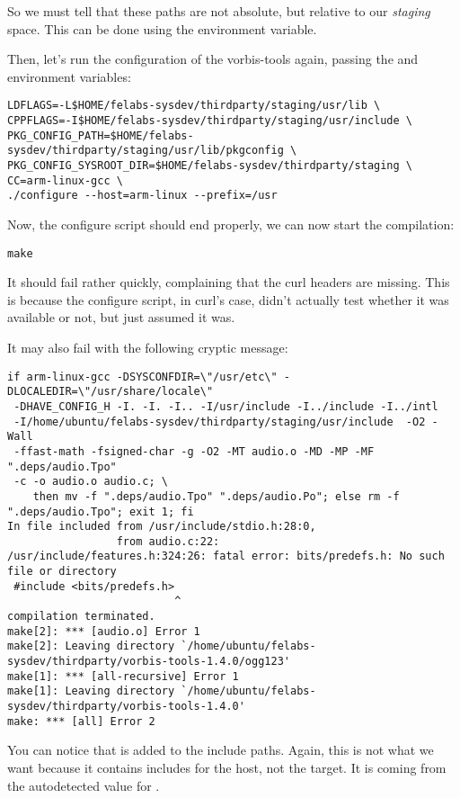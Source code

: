 So we must tell  that these paths are not absolute,
but relative to our {\em staging} space. This can be done using the
 environment variable.

Then, let's run the configuration of the vorbis-tools again, passing
the  and 
environment variables:

\small
\begin{verbatim}
LDFLAGS=-L$HOME/felabs-sysdev/thirdparty/staging/usr/lib \
CPPFLAGS=-I$HOME/felabs-sysdev/thirdparty/staging/usr/include \
PKG_CONFIG_PATH=$HOME/felabs-sysdev/thirdparty/staging/usr/lib/pkgconfig \
PKG_CONFIG_SYSROOT_DIR=$HOME/felabs-sysdev/thirdparty/staging \
CC=arm-linux-gcc \
./configure --host=arm-linux --prefix=/usr
\end{verbatim}
\normalsize

Now, the configure script should end properly, we can now start the
compilation:
\begin{verbatim}
make
\end{verbatim}

It should fail rather quickly, complaining that the curl headers are
missing. This is because the configure script, in curl's case, didn't
actually test whether it was available or not, but just assumed it was.

It may also fail with the following cryptic message:
\small
\begin{verbatim}
if arm-linux-gcc -DSYSCONFDIR=\"/usr/etc\" -DLOCALEDIR=\"/usr/share/locale\"
 -DHAVE_CONFIG_H -I. -I. -I.. -I/usr/include -I../include -I../intl
 -I/home/ubuntu/felabs-sysdev/thirdparty/staging/usr/include  -O2 -Wall
 -ffast-math -fsigned-char -g -O2 -MT audio.o -MD -MP -MF ".deps/audio.Tpo"
 -c -o audio.o audio.c; \
	then mv -f ".deps/audio.Tpo" ".deps/audio.Po"; else rm -f ".deps/audio.Tpo"; exit 1; fi
In file included from /usr/include/stdio.h:28:0,
                 from audio.c:22:
/usr/include/features.h:324:26: fatal error: bits/predefs.h: No such file or directory
 #include <bits/predefs.h>
                          ^
compilation terminated.
make[2]: *** [audio.o] Error 1
make[2]: Leaving directory `/home/ubuntu/felabs-sysdev/thirdparty/vorbis-tools-1.4.0/ogg123'
make[1]: *** [all-recursive] Error 1
make[1]: Leaving directory `/home/ubuntu/felabs-sysdev/thirdparty/vorbis-tools-1.4.0'
make: *** [all] Error 2
\end{verbatim}
\normalsize

You can notice that  is added to the include paths.
Again, this is not what we want because it contains includes for the
host, not the target. It is coming from the autodetected value for
.

